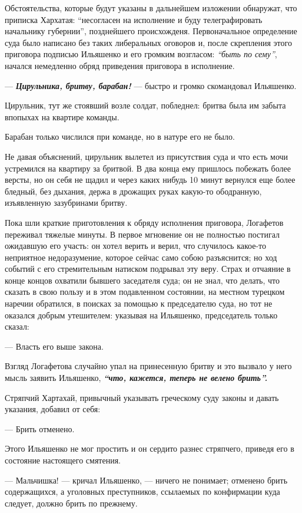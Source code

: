 \documentclass[a4paper,20pt]{article}
\begin{document}
Обстоятельства, которые будут указаны в дальнейшем
изложении обнаружат, что приписка Хархатая: ``несогласен
на исполнение и буду телеграфировать начальнику губернии'',
позднейшего происхожденя. Первоначальное определение суда
было написано без таких либеральных оговоров и, после
скрепления этого приговора подписью Ильяшенко и его громким возгласом: 
\emph{``быть по сему''}, начался немедленно обряд приведения 
приговора в исполнение.

— \textbf{\emph{Цирульника, бритву, барабан!}} — быстро и громко скомандовал Ильяшенко.

Цирульник, тут же стоявший возле солдат, побледнел: бритва была им забыта
впопыхах на квартире команды.

Барабан только числился при команде, но в натуре его не было.

Не давая объяснений, цирульник вылетел из присутствия суда и что есть мочи
устремился на квартиру за бритвой. В два конца ему пришлось побежать более
версты, но он себя не щадил и через каких нибудь 10 минут вернулся еще более
бледный, без дыхания, держа в дрожащих руках какую-то ободранную, изъявленную
зазубринами бритву.

Пока шли краткие приготовления к обряду исполнения приговора, Логафетов
переживал тяжелые минуты. В первое мгновение он не полностью постигал ожидавшую
его участь: он хотел верить и верил, что случилось какое-то неприятное
недоразумение, которое сейчас само собою разъяснится; но ход событий с его
стремительным натиском подрывал эту веру. Страх и отчаяние в конце концов
охватили бывшего заседателя суда; он не знал, что делать, что сказать в свою
пользу и в этом подавленном состоянии, на местном турецком наречии обратился,
в поисках за помощью к председателю суда, но тот не оказался добрым утешителем:
указывая на Ильяшенко, председатель только сказал:

— Власть его выше закона.

Взгляд Логафетова случайно упал на принесенную
бритву и это вызвало у него мысль заявить Ильяшенко,
\textbf{\emph{``что, кажется, теперь не велено брить''.}}

Стряпчий Хартахай, привычный указывать греческому
суду законы и давать указания, добавил от себя:

— Брить отменено.

Этого Ильяшенко не мог простить и он сердито разнес стряпчего, 
приведя его в состояние настоящего смятения.

— Мальчишка! — кричал Ильяшенко, — ничего не понимает; отменено брить содержащихся, 
а уголовных преступников, ссылаемых по конфирмации куда следует,
должно брить по прежнему.
\end{document}
